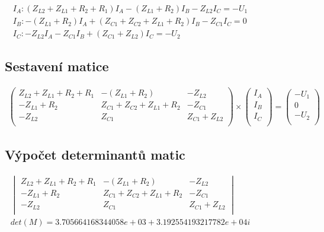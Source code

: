 \begin{figure}[h!]
    \begin{gather*}
        I_A: (Z_{L2} + Z_{L1} + R_2 + R_1)I_A - (Z_{L1} + R_2)I_B - Z_{L2}I_C = -U_1\\
        I_B: - (Z_{L1} + R_2)I_A + (Z_{C1} + Z_{C2} + Z_{L1} + R_2)I_B - Z_{C1}I_C = 0 \\ 
        I_C: - Z_{L2}I_A - Z_{C1}I_B + (Z_{C1} + Z_{L2})I_C = -U_2 
   \end{gather*}
   \subsection*{Sestavení matice}
   \begin{gather*}
        \begin{pmatrix}
            Z_{L2} + Z_{L1} + R_2 + R_1 & - (Z_{L1} + R_2) & - Z_{L2} \\
            - Z_{L1} + R_2 & Z_{C1} + Z_{C2} + Z_{L1} + R_2 & - Z_{C1} \\
            - Z_{L2} & Z_{C1} & Z_{C1} + Z_{L2} \\
        \end{pmatrix}
        \times
        \begin{pmatrix}
            I_A \\
            I_B \\
            I_C \\
        \end{pmatrix}
        =
        \begin{pmatrix}
            - U_1 \\
            0 \\
            - U_2 \\
        \end{pmatrix}
   \end{gather*}
\end{figure}
\begin{figure}[h!]
   \subsection*{Výpočet determinantů matic}
   \begin{gather*}
        \begin{vmatrix}
            Z_{L2} + Z_{L1} + R_2 + R_1 & - (Z_{L1} + R_2) & - Z_{L2} \\
            - Z_{L1} + R_2 & Z_{C1} + Z_{C2} + Z_{L1} + R_2 & - Z_{C1} \\
            - Z_{L2} & Z_{C1} & Z_{C1} + Z_{L2} \\
        \end{vmatrix}
        \\
        det(M) = 3.705664168344058e+03 + 3.192554193217782e+04i
    \end{gather*}
\end{figure}
